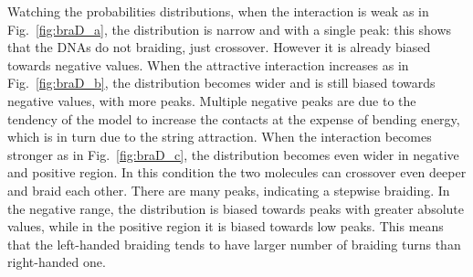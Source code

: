\documentclass[a4paper,10pt]{article}
\begin{document}
Watching the probabilities distributions, when the interaction is weak as in Fig.~\ref{fig:braD_a}, the distribution is narrow and with a single peak: this shows that the DNAs do not braiding, just crossover.
However it is already biased towards negative values.
When the attractive interaction increases as in Fig.~\ref{fig:braD_b}, the distribution becomes wider and is still biased towards negative values, with more peaks.
Multiple negative peaks are due to the tendency of the model to increase the contacts at the expense of bending energy, which is in turn due to the string attraction.
When the interaction becomes stronger as in Fig.~\ref{fig:braD_c}, the distribution becomes even wider in negative and positive region.
In this condition the two molecules can crossover even deeper and braid each other.
There are many peaks, indicating a stepwise braiding.
In the negative range, the distribution is biased towards peaks with greater absolute values, while in the positive region it is biased towards low peaks.
This means that the left-handed braiding tends to have larger number of braiding turns than right-handed one.
\end{document}
